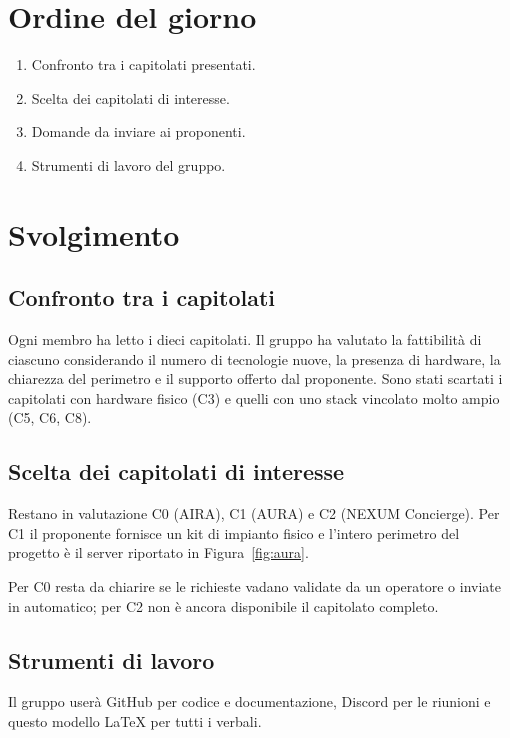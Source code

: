 \documentclass[verbale=interno]{gpt}
\begin{document}
\section{Ordine del giorno}
\begin{enumerate}
  \item Confronto tra i capitolati presentati.
  \item Scelta dei capitolati di interesse.
  \item Domande da inviare ai proponenti.
  \item Strumenti di lavoro del gruppo.
\end{enumerate}

\section{Svolgimento}

\subsection{Confronto tra i capitolati}
Ogni membro ha letto i dieci capitolati. Il gruppo ha valutato la
fattibilità di ciascuno considerando il numero di tecnologie nuove,
la presenza di hardware, la chiarezza del perimetro e il supporto
offerto dal proponente. Sono stati scartati i capitolati con hardware
fisico (C3) e quelli con uno stack vincolato molto ampio (C5, C6, C8).

\subsection{Scelta dei capitolati di interesse}
Restano in valutazione C0 (AIRA), C1 (AURA) e C2 (NEXUM Concierge).
Per C1 il proponente fornisce un kit di impianto fisico e l'intero
perimetro del progetto è il server  riportato in
Figura~\ref{fig:aura}.


\begin{nota}
Per C0 resta da chiarire se le richieste vadano validate da un operatore
o inviate in automatico; per C2 non è ancora disponibile il capitolato
completo.
\end{nota}

\subsection{Strumenti di lavoro}
Il gruppo userà GitHub per codice e documentazione, Discord per le
riunioni e questo modello \LaTeX{} per tutti i verbali.
\end{document}
